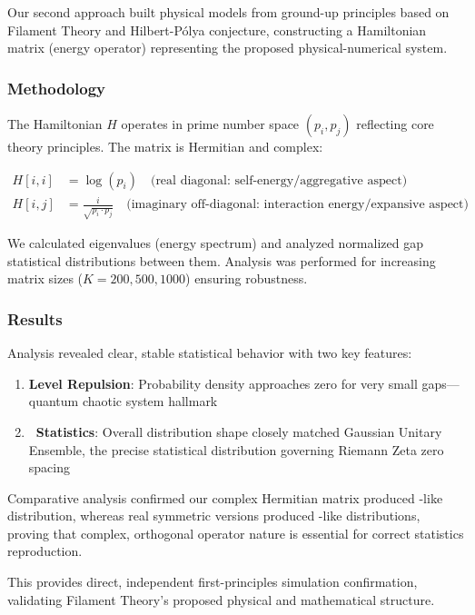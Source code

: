 \documentclass[11pt,a4paper]{article}
\newcommand{\GUE}{\text{GUE}}
\newcommand{\GOE}{\text{GOE}}
\begin{document}
Our second approach built physical models from ground-up principles based on Filament Theory and Hilbert-Pólya conjecture, constructing a Hamiltonian matrix (energy operator) representing the proposed physical-numerical system.

\subsubsection{Methodology}

The Hamiltonian $H$ operates in prime number space $(p_i, p_j)$ reflecting core theory principles. The matrix is Hermitian and complex:

\begin{align}
H[i,i] &= \log(p_i) \quad \text{(real diagonal: self-energy/aggregative aspect)}\\
H[i,j] &= \frac{i}{\sqrt{p_i \cdot p_j}} \quad \text{(imaginary off-diagonal: interaction energy/expansive aspect)}
\end{align}

We calculated eigenvalues (energy spectrum) and analyzed normalized gap statistical distributions between them. Analysis was performed for increasing matrix sizes ($K = 200, 500, 1000$) ensuring robustness.

\subsubsection{Results}

Analysis revealed clear, stable statistical behavior with two key features:

\begin{enumerate}
\item \textbf{Level Repulsion}: Probability density approaches zero for very small gaps—quantum chaotic system hallmark
\item \textbf{\GUE\ Statistics}: Overall distribution shape closely matched Gaussian Unitary Ensemble, the precise statistical distribution governing Riemann Zeta zero spacing
\end{enumerate}

Comparative analysis confirmed our complex Hermitian matrix produced \GUE-like distribution, whereas real symmetric versions produced \GOE-like distributions, proving that complex, orthogonal operator nature is essential for correct statistics reproduction.

This provides direct, independent first-principles simulation confirmation, validating Filament Theory's proposed physical and mathematical structure.
\end{document}

